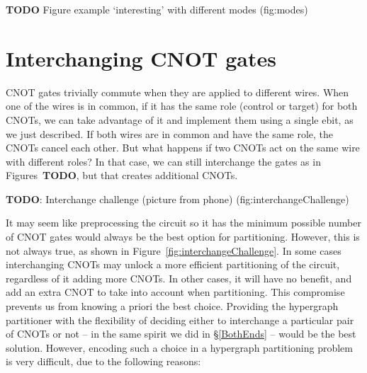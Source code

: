 \textbf{TODO} Figure example `interesting' with different modes (fig:modes)

\section{Interchanging CNOT gates}

CNOT gates trivially commute when they are applied to different wires. When one of the wires is in common, if it has the same role (control or target) for both CNOTs, we can take advantage of it and implement them using a single ebit, as we just described. If both wires are in common and have the same role, the CNOTs cancel each other. But what happens if two CNOTs act on the same wire with different roles? In that case, we can still interchange the gates as in Figures~\textbf{TODO}, but that creates additional CNOTs.

\textbf{TODO}: Interchange challenge (picture from phone) (fig:interchangeChallenge)

It may seem like preprocessing the circuit so it has the minimum possible number of CNOT gates would always be the best option for partitioning. However, this is not always true, as shown in Figure~\ref{fig:interchangeChallenge}. In some cases interchanging CNOTs may unlock a more efficient partitioning of the circuit, regardless of it adding more CNOTs. In other cases, it will have no benefit, and add an extra CNOT to take into account when partitioning. This compromise prevents us from knowing a priori the best choice. Providing the hypergraph partitioner with the flexibility of deciding either to interchange a particular pair of CNOTs or not -- in the same spirit we did in \S\ref{BothEnds} -- would be the best solution. However, encoding such a choice in a hypergraph partitioning problem is very difficult, due to the following reasons:

